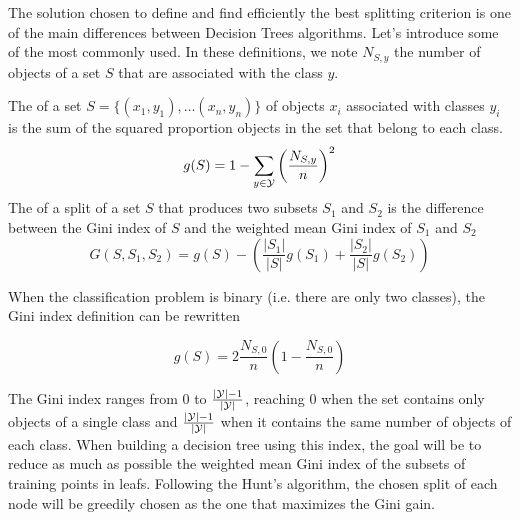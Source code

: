 The solution chosen to define and find efficiently the best splitting criterion is one of the main differences between Decision Trees algorithms. Let's introduce some of the most commonly used. In these definitions, we note $N_{S, y}$ the number of objects of a set $S$ that are associated with the class $y$.

\begin{definition}
    The  of a set $S = \{(x_1, y_1), \dots\allowbreak (x_n, y_n)\}$ of objects $x_i$ associated with classes $y_i$ is the sum of the squared proportion objects in the set that belong to each class.
    \begin{equation}\label{eq:general_gini_index_def}
        g(S) = 1 - \sum_{y \in \mathcal{Y}} \left(\frac{N_{S, y}}{n}\right)^2
    \end{equation}
    The  of a split of a set $S$ that produces two subsets $S_1$ and $S_2$ is the difference between the Gini index of $S$ and the weighted mean Gini index of $S_1$ and $S_2$
    \begin{equation}
        G(S, S_1, S_2) = g(S) - \left(\frac{|S_1|}{|S|} g(S_1) + \frac{|S_2|}{|S|} g(S_2)\right)
    \end{equation}
\end{definition}

When the classification problem is binary (i.e. there are only two classes), the Gini index definition can be rewritten

\begin{equation}
    g(S) = 2 \frac{N_{S, 0}}{n} \left(1 - \frac{N_{S, 0}}{n}\right)
\end{equation}

The Gini index ranges from $0$ to $\frac{|\mathcal{Y}| - 1}{|\mathcal{Y}|}$, reaching $0$ when the set contains only objects of a single class and $\frac{|\mathcal{Y}| - 1}{|\mathcal{Y}|}$ when it contains the same number of objects of each class. When building a decision tree using this index, the goal will be to reduce as much as possible the weighted mean Gini index of the subsets of training points in leafs. Following the Hunt's algorithm, the chosen split of each node will be greedily chosen as the one that maximizes the Gini gain.

